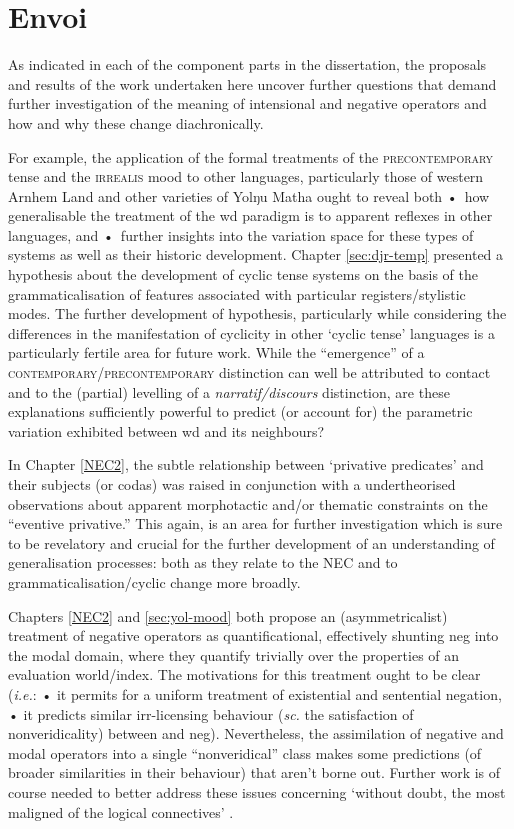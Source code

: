 \documentclass[11pt,dvipsnames]{report}
\begin{document}
\section{Envoi}

As indicated in each of the component parts in the dissertation, the proposals and results of the work undertaken here uncover further questions that demand further investigation of the meaning of intensional and negative operators and how and why these change diachronically.

For example, the application of the formal treatments of the \textsc{precontemporary} tense and the \textsc{irrealis} mood to other languages, particularly those of western Arnhem Land and other varieties of Yolŋu Matha ought to reveal both •~how generalisable the treatment of the \acrshort{wd} paradigm is to apparent reflexes in other languages, and •~further insights into the variation space for these types of systems as well as their historic development. Chapter \ref{sec:djr-temp} presented a hypothesis about the development of cyclic tense systems on the basis of the grammaticalisation of features associated with particular registers\slash stylistic modes. The further development of hypothesis, particularly while considering the differences in the manifestation of cyclicity in other `cyclic tense' languages is a particularly fertile area for future work. While the ``emergence'' of a \textsc{contemporary}\slash\textsc{precontemporary} distinction can well be attributed to contact and to the (partial) levelling of a \textit{narratif\slash discours} distinction, are these explanations sufficiently powerful to predict (or account for) the parametric variation exhibited between \acrshort{wd} and its neighbours?

In Chapter \ref{NEC2}, the subtle relationship between `privative predicates' and their subjects (or codas) was raised in conjunction with a undertheorised observations about apparent morphotactic and/or thematic constraints on the ``eventive privative.'' This again, is an area for further investigation which is sure to be revelatory and crucial for the further development of an understanding of generalisation processes: both as they relate to the \acrshort{NEC} and to grammaticalisation\slash cyclic change more broadly.

Chapters \ref{NEC2} and \ref{sec:yol-mood} both propose an (asymmetricalist) treatment of negative operators as quantificational, effectively shunting \gls{neg} into the modal domain, where they quantify trivially over the properties of an evaluation world/index. The motivations for this treatment ought to be clear (\textit{i.e.}: • it permits for a uniform treatment of existential and sentential negation, • it predicts similar \gls{irr}-licensing behaviour (\textit{sc.} the satisfaction of nonveridicality) between  and \gls{neg}). Nevertheless, the assimilation of negative and modal operators into a single ``nonveridical'' class makes some predictions (of broader similarities in their behaviour) that aren't borne out. Further work is of course needed to better address these issues concerning `without doubt, the most maligned of the logical connectives' \citep[45]{Horn1984}.
\end{document}

